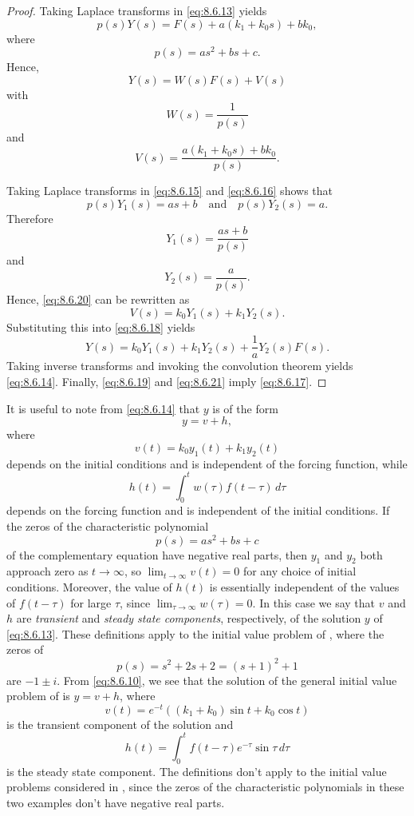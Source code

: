 \begin{proof}
 Taking Laplace transforms in   \eqref{eq:8.6.13} yields
 \[
p(s)Y(s)=F(s)+a(k_1+k_0s)+bk_0,
\]
where
\[
p(s)=as^2+bs+c.
\]
Hence,
\begin{equation}\label{eq:8.6.18}
Y(s)=W(s)F(s)+V(s)
\end{equation}
with
\begin{equation}\label{eq:8.6.19}
W(s)=\frac{1}{p(s)}
\end{equation}
and
\begin{equation}\label{eq:8.6.20}
V(s)=\frac{a(k_1+k_0s)+bk_0}{p(s)}.
\end{equation}

Taking Laplace transforms in  \eqref{eq:8.6.15} and  \eqref{eq:8.6.16} shows that
\[
p(s)Y_1(s)=as+b\quad\text{and}\quad p(s)Y_2(s)=a.
\]
Therefore
\[
Y_1(s)=\frac{as+b}{p(s)}
\]
and
\begin{equation}\label{eq:8.6.21}
 Y_2(s)=\frac{a}{p(s)}.
\end{equation}
Hence,  \eqref{eq:8.6.20} can be rewritten as
\[
V(s)=k_0Y_1(s)+k_1Y_2(s).
\]
Substituting  this  into  \eqref{eq:8.6.18} yields
\[
Y(s)=k_0Y_1(s)+k_1Y_2(s)+\frac{1}{a}Y_2(s)F(s).
\]
Taking inverse transforms and invoking the convolution theorem yields
 \eqref{eq:8.6.14}. Finally,   \eqref{eq:8.6.19} and  \eqref{eq:8.6.21}
imply  \eqref{eq:8.6.17}.
\end{proof}

It is useful to note from \eqref{eq:8.6.14} that $y$ is of the form
\[
y=v+h,
\]
where
\[
v(t)=k_0y_1(t)+k_1y_2(t)
\]
depends on the initial conditions and is independent of the forcing
function, while
\[
h(t)=\int_0^tw(\tau)f(t-\tau)\,
d\tau
\]
depends on the forcing function and is independent of the initial
conditions. If the zeros of the characteristic polynomial
\[
p(s)=as^2+bs+c
\]
of the complementary equation have negative real parts, then $y_1$ and
$y_2$ both approach zero as $t\to\infty$, so $\lim_{t\to\infty}v(t)=0$
for any choice of initial conditions. Moreover, the value of $h(t)$ is
essentially independent of the values of $f(t-\tau)$ for large $\tau$,
since $\lim_{\tau\to\infty}w(\tau)=0$. In this case we say that $v$
and $h$ are \emph{\color{blue}transient} and \emph{\color{blue}steady state components},
respectively, of the solution $y$ of \eqref{eq:8.6.13}. These definitions
apply to the initial value problem of , where
the zeros of
\[
p(s)=s^2+2s+2=(s+1)^2+1
\]
are $-1\pm i$. From  \eqref{eq:8.6.10}, we see that the solution of the
general initial value problem  of  is $y=v+h$,
where
\[
v(t)=e^{-t}\left((k_1+k_0)\sin t+k_0\cos t\right)
\]
is the transient component of the solution and
\[
h(t)=\int_0^t f(t-\tau)e^{-\tau}\sin\tau\,d\tau
\]
is the steady state component. The definitions don't apply to the initial
value problems  considered in , since the zeros of the characteristic polynomials
in these two examples don't have negative real parts.

